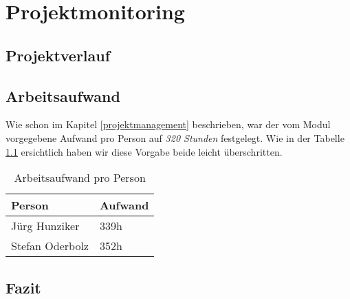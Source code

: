 \chapter{Projektmonitoring}
\label{projektmonitoring}

\section{Projektverlauf}

\section{Arbeitsaufwand}
Wie schon im Kapitel \ref{projektmanagement} beschrieben, war der vom Modul vorgegebene Aufwand pro Person auf \emph{320 Stunden} festgelegt. Wie in der Tabelle \ref{projektmanagement-arbeitsaufwand} ersichtlich haben wir diese Vorgabe beide leicht überschritten.

\begin{table}[H]
\centering
\begin{tabular}{|l|l|}
\hline 
\textbf{Person} & \textbf{Aufwand} \\ 
\hline 
Jürg Hunziker & 339h \\
\hline 
Stefan Oderbolz & 352h \\  
\hline 
\end{tabular}
\caption{Arbeitsaufwand pro Person}
\label{projektmanagement-arbeitsaufwand}
\end{table} 

\section{Fazit}